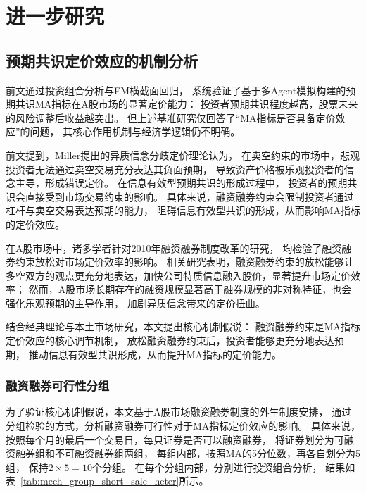 
\chapter{进一步研究}

\section{预期共识定价效应的机制分析}

前文通过投资组合分析与FM横截面回归，
系统验证了基于多Agent模拟构建的预期共识MA指标在A股市场的显著定价能力：
投资者预期共识程度越高，股票未来的风险调整后收益越突出。
但上述基准研究仅回答了“MA指标是否具备定价效应”的问题，
其核心作用机制与经济学逻辑仍不明确。

前文提到，Miller提出的异质信念分歧定价理论认为，
在卖空约束的市场中，悲观投资者无法通过卖空交易充分表达其负面预期，
导致资产价格被乐观投资者的信念主导，形成错误定价\cite{miller1977risk}。
在信息有效型预期共识\cite{easley1983consensus}\cite{verrecchia2001essays}的形成过程中，
投资者的预期共识会直接受到市场交易约束的影响。
具体来说，融资融券约束会限制投资者通过杠杆与卖空交易表达预期的能力，
阻碍信息有效型共识的形成，从而影响MA指标的定价效应。

在A股市场中，诸多学者针对2010年融资融券制度改革的研究，
均检验了融资融券约束放松对市场定价效率的影响。
相关研究表明，融资融券约束的放松能够让多空双方的观点更充分地表达，加快公司特质信息融入股价，显著提升市场定价效率；
然而，A股市场长期存在的融资规模显著高于融券规模的非对称特征，也会强化乐观预期的主导作用，
加剧异质信念带来的定价扭曲\cite{王永钦2026杠杆信息与流动性}\cite{褚2019margin}\cite{顾琪2017卖空摩擦与股价同步性}\cite{陈国进2008异质信念与盈余惯性}。

结合经典理论与本土市场研究，本文提出核心机制假说：
融资融券约束是MA指标定价效应的核心调节机制，
放松融资融券约束后，投资者能够更充分地表达预期，
推动信息有效型共识形成，从而提升MA指标的定价能力。

\subsection{融资融券可行性分组}  
为了验证核心机制假说，本文基于A股市场融资融券制度的外生制度安排，
通过分组检验的方式，分析融资融券可行性对于MA指标定价效应的影响。
具体来说，按照每个月的最后一个交易日，每只证券是否可以融资融券，
将证券划分为可融资融券组和不可融资融券组两组，
每组内部，按照MA的5分位数，再各自划分为5组，
保持$2 \times 5 = 10$个分组。
在每个分组内部，分别进行投资组合分析，
结果如表~\ref{tab:mech_group_short_sale_heter}所示。

